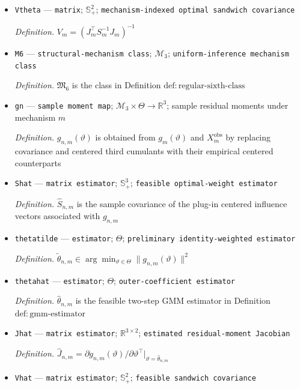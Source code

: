 \documentclass{article}
\begin{document}
\begin{itemize}
  \item \texttt{Vtheta} --- \texttt{matrix}; \(\mathbb S_+^2\); \texttt{mechanism-\allowbreak{}indexed optimal sandwich covariance}
  \par\smallskip\noindent\emph{Definition.} \(V_m=(J_m^\top S_m^{-1}J_m)^{-1}\)
  \item \texttt{M6} --- \texttt{structural-\allowbreak{}mechanism class}; \(\mathcal M_3\); \texttt{uniform-\allowbreak{}inference mechanism class}
  \par\smallskip\noindent\emph{Definition.} \(\mathfrak M_6\) is the class in Definition \(\mathrm{def:regular\mbox{-}sixth\mbox{-}class}\)
  \item \texttt{gn} --- \texttt{sample moment map}; \(\mathcal M_3\times\Theta\to\mathbb R^3\); sample residual moments under mechanism \(m\)
  \par\smallskip\noindent\emph{Definition.} \(g_{n,m}(\vartheta)\) is obtained from \(g_m(\vartheta)\) and \(X_m^{\mathrm{obs}}\) by replacing covariance and centered third cumulants with their empirical centered counterparts
  \item \texttt{Shat} --- \texttt{matrix estimator}; \(\mathbb S_+^3\); \texttt{feasible optimal-\allowbreak{}weight estimator}
  \par\smallskip\noindent\emph{Definition.} \(\widehat S_{n,m}\) is the sample covariance of the plug-in centered influence vectors associated with \(g_{n,m}\)
  \item \texttt{thetatilde} --- \texttt{estimator}; \(\Theta\); \texttt{preliminary identity-\allowbreak{}weighted estimator}
  \par\smallskip\noindent\emph{Definition.} \(\widetilde\theta_{n,m}\in\arg\min_{\vartheta\in\Theta}\|g_{n,m}(\vartheta)\|^2\)
  \item \texttt{thetahat} --- \texttt{estimator}; \(\Theta\); \texttt{outer-\allowbreak{}coefficient estimator}
  \par\smallskip\noindent\emph{Definition.} \(\widehat\theta_{n,m}\) is the feasible two-step GMM estimator in Definition \(\mathrm{def:gmm\mbox{-}estimator}\)
  \item \texttt{Jhat} --- \texttt{matrix estimator}; \(\mathbb R^{3\times2}\); \texttt{estimated residual-\allowbreak{}moment Jacobian}
  \par\smallskip\noindent\emph{Definition.} \(\widehat J_{n,m}=\partial g_{n,m}(\vartheta)/\partial\vartheta^\top\vert_{\vartheta=\widehat\theta_{n,m}}\)
  \item \texttt{Vhat} --- \texttt{matrix estimator}; \(\mathbb S_+^2\); \texttt{feasible sandwich covariance}

\end{itemize}
\end{document}
